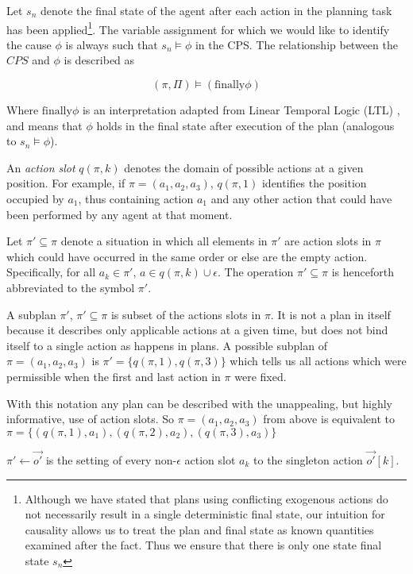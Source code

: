 \documentclass{article}
\theoremstyle{plain}
\theoremstyle{definition}
\begin{document}
Let $s_n$ denote the final state of the agent after each action in the planning task has been applied\footnote{Although we have stated that plans using conflicting exogenous actions do not necessarily result in a single deterministic final state, our intuition for causality allows us to treat the plan and final state as known quantities examined after the fact. Thus we ensure that there is only one state final state $s_n$}. The variable assignment for which we would like to identify the cause $\phi$ is always such that $s_n \models \phi$ in the CPS. The relationship between the $CPS$ and $\phi$ is described as

\[
(\pi, \Pi) \models (\textrm{finally} \phi)
\]

Where $\textrm{finally} \phi$ is an interpretation adapted from Linear Temporal Logic (LTL) \cite{galton1987temporal}, and means that $\phi$ holds in the final state after execution of the plan (analogous to $s_n \models \phi$).

An \textit{action slot} $q(\pi,k)$ denotes the domain of possible actions at a given position. For example, if $\pi=(a_1,a_2,a_3)$, $q(\pi,1)$ identifies the position occupied by $a_1$, thus containing action $a_1$ and any other action that could have been performed by any agent at that moment.

Let $\pi'\subseteq \pi$ denote a situation in which all elements in $\pi'$ are action slots in $\pi$ which could have occurred in the same order or else are the empty action. Specifically, for all $a_k \in \pi'$, $a \in q(\pi,k) \cup \epsilon$. The operation $\pi'\subseteq \pi$ is henceforth abbreviated to the symbol $\pi'$.

A subplan $\pi'$, $\pi' \subseteq \pi$ is subset of the actions slots in $\pi$. It is not a plan in itself because it describes only applicable actions at a given time, but does not bind itself to a single action as happens in plans. A possible subplan of $\pi=(a_1, a_2, a_3)$ is $\pi'=\{q(\pi,1), q(\pi,3)\}$ which tells us all actions which were permissible when the first and last action in $\pi$ were fixed.

With this notation any plan can be described with the unappealing, but highly informative, use of action slots. So $\pi=(a_1, a_2, a_3)$ from above is equivalent to $\pi= \{(q(\pi,1),a_1), (q(\pi,2),a_2), (q(\pi,3),a_3)  \}$

$\pi' \leftarrow \vec{o'}$ is the setting of every non-$\epsilon$ action slot $a_k$ to the singleton action $\vec{o'}[k]$.
\end{document}
